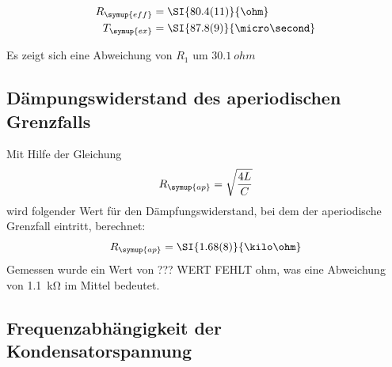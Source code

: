 \begin{align*}
  R_\symup{eff} &= \SI{80.4(11)}{\ohm} \\
  T_\symup{ex} &= \SI{87.8(9)}{\micro\second}
\end{align*}


Es zeigt sich eine Abweichung von $R_1$ um $\SI{30.1}{ohm}$

\subsection{Dämpungswiderstand des aperiodischen Grenzfalls}

Mit Hilfe der Gleichung
\begin{equation}
  R_\symup{ap} = \sqrt{\frac{4L}{C}}
\end{equation}
wird folgender Wert für den Dämpfungswiderstand, bei dem der
aperiodische Grenzfall eintritt, berechnet:
\begin{equation}
  R_\symup{ap} = \SI{1.68(8)}{\kilo\ohm}
\end{equation}
Gemessen wurde ein Wert von ??? WERT FEHLT \si{ohm}, was eine Abweichung von \SI{1.1}{\kilo\ohm} im Mittel bedeutet.


\subsection{Frequenzabhängigkeit der Kondensatorspannung}

